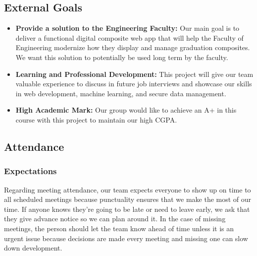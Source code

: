 \documentclass{article}
\begin{document}

\subsection*{External Goals}

\begin{itemize}
    \item \textbf{Provide a solution to the Engineering Faculty:}  
    Our main goal is to deliver a functional digital composite web app that will help the Faculty of Engineering modernize how they display and manage graduation composites. We want this solution to potentially be used long term by the faculty.

    \item \textbf{Learning and Professional Development:}  
    This project will give our team valuable experience to discuss in future job interviews and showcase our skills in web development, machine learning, and secure data management.

    \item \textbf{High Academic Mark:}  
    Our group would like to achieve an A+ in this course with this project to maintain our high CGPA.
\end{itemize}

\subsection*{Attendance}

\subsubsection*{Expectations}

\newline
Regarding meeting attendance, our team expects everyone to show up on time to all scheduled meetings because punctuality ensures that we make the most of our time. If anyone knows they’re going to be late or need to leave early, we ask that they give advance notice so we can plan around it. In the case of missing meetings, the person should let the team know ahead of time unless it is an urgent issue because decisions are made every meeting and missing one can slow down development.
\end{document}
